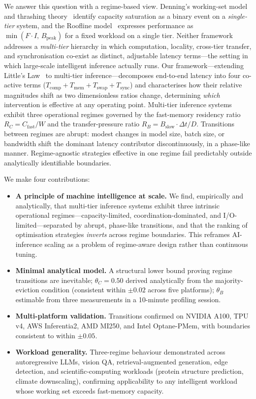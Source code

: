We answer this question with a regime-based view.
Denning's working-set model and thrashing theory~\cite{mattson1970evaluation}
identify capacity saturation as a binary event on a \emph{single-tier} system,
and the Roofline model~\cite{williams2009roofline} expresses performance as
$\min(F \cdot I,\, B_{\mathrm{peak}})$ for a fixed workload on a single tier.
Neither framework addresses a \emph{multi-tier} hierarchy in which computation,
locality, cross-tier transfer, and synchronisation co-exist as distinct,
adjustable latency terms---the setting in which large-scale intelligent
inference actually runs.
Our framework---extending Little's Law~\cite{kleinrock1975queueing} to multi-tier
inference---decomposes end-to-end latency into four co-active terms
($T_{\mathrm{comp}} + T_{\mathrm{mem}} + T_{\mathrm{swap}} + T_{\mathrm{sync}}$)
and characterises how their relative magnitudes shift as two dimensionless
ratios change, determining \emph{which} intervention is effective at any
operating point.
Multi-tier inference systems exhibit three operational regimes governed by the
fast-memory residency ratio $R_C = C_{\mathrm{fast}}/W$ and the
transfer-pressure ratio $R_B = B_{\mathrm{slow}} \cdot \Delta t / D$.
Transitions between regimes are abrupt: modest changes in model size, batch
size, or bandwidth shift the dominant latency contributor discontinuously, in a
phase-like manner.
Regime-agnostic strategies effective in one regime fail predictably outside
analytically identifiable boundaries.

We make four contributions:
\begin{itemize}
  \item \textbf{A principle of machine intelligence at scale.}
    We find, empirically and analytically, that multi-tier inference systems
    exhibit three intrinsic operational regimes---capacity-limited,
    coordination-dominated, and I/O-limited---separated by abrupt, phase-like
    transitions, and that the ranking of optimisation strategies \emph{inverts}
    across regime boundaries. This reframes AI-inference scaling as a problem of
    regime-aware design rather than continuous tuning.
  \item \textbf{Minimal analytical model.}
    A structural lower bound proving regime transitions are inevitable;
    $\theta_C = 0.50$ derived analytically from the majority-eviction condition
    (consistent within $\pm 0.02$ across five platforms);
    $\theta_B$ estimable from three measurements in a 10-minute profiling session.
  \item \textbf{Multi-platform validation.}
    Transitions confirmed on NVIDIA A100, TPU v4, AWS Inferentia2, AMD MI250,
    and Intel Optane-PMem, with boundaries consistent to within $\pm 0.05$.
  \item \textbf{Workload generality.}
    Three-regime behaviour demonstrated across autoregressive LLMs, vision QA,
    retrieval-augmented generation, edge detection, and scientific-computing
    workloads (protein structure prediction, climate downscaling), confirming
    applicability to any intelligent workload whose working set exceeds
    fast-memory capacity.
\end{itemize}

